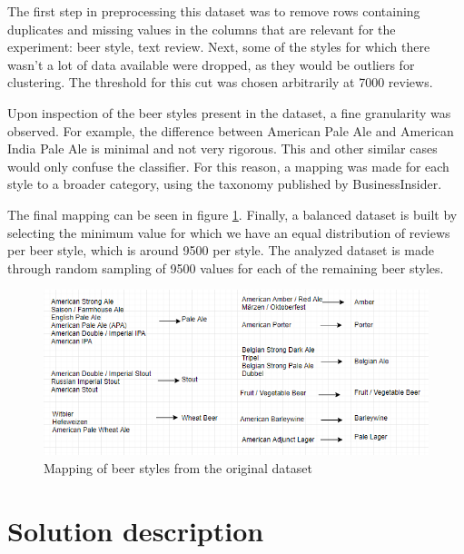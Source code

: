 \documentclass[12pt]{article}
\begin{document}
	The first step in preprocessing this dataset was to remove rows containing duplicates and missing values in the columns that are relevant for the experiment: beer style, text review. Next, some of the styles for which there wasn't a lot of data available were dropped, as they would be outliers for clustering. The threshold for this cut was chosen arbitrarily at 7000 reviews. 
	
	Upon inspection of the beer styles present in the dataset, a fine granularity was observed. For example, the difference between American Pale Ale and American India Pale Ale is minimal and not very rigorous. This and other similar cases would only confuse the classifier. For this reason, a mapping was made for each style to a broader category, using the taxonomy published by BusinessInsider\cite{BeerTaxonomy}. 
	
	The final mapping can be seen in figure \ref{fig:styleMapping}. Finally, a balanced dataset is built by selecting the minimum value for which we have an equal distribution of reviews per beer style, which is around 9500 per style. The analyzed dataset is made through random sampling of 9500 values for each of the remaining beer styles.
	
	\begin{figure}
		\includegraphics[width=\linewidth]{resources/MappingDiagram.png}
		\caption{Mapping of beer styles from the original dataset}
		\label{fig:styleMapping}
	\end{figure}

	\section{Solution description}
\end{document}
